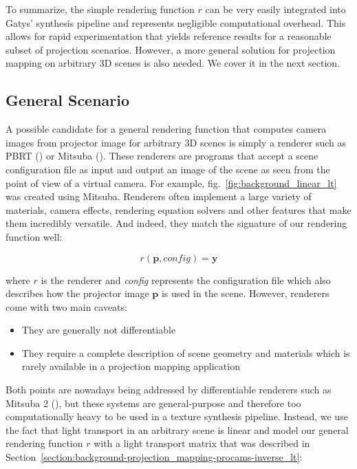 To summarize, the simple rendering function \(r\) can be very easily integrated into Gatys' synthesis pipeline and represents negligible computational overhead. This allows for rapid experimentation that yields reference results for a reasonable subset of projection scenarios. However, a more general solution for projection mapping on arbitrary 3D scenes is also needed. We cover it in the next section.

\subsection{General Scenario}
\label{section:methods-rendering_function-general}

A possible candidate for a general rendering function that computes camera images from projector image for arbitrary 3D scenes is simply a renderer such as PBRT (\citet{PBRT3e}) or Mitsuba (\citet{Mitsuba}). These renderers are programs that accept a scene configuration file as input and output an image of the scene as seen from the point of view of a virtual camera. For example, fig.~\ref{fig:background_linear_lt} was created using Mitsuba. Renderers often implement a large variety of materials, camera effects, rendering equation solvers and other features that make them incredibly versatile. And indeed, they match the signature of our rendering function well:

\begin{equation}
    \label{eq:rendering_function-renderer}
    r(\bm{p}, \textit{config}) = \bm{y}
\end{equation}

where \(r\) is the renderer and \textit{config} represents the configuration file which also describes how the projector image \(\bm{p}\) is used in the scene. However, renderers come with two main caveats:

\begin{itemize}
    \item They are generally not differentiable
    \item They require a complete description of scene geometry and materials which is rarely available in a projection mapping application
\end{itemize}

Both points are nowadays being addressed by differentiable renderers such as Mitsuba 2 (\citet{Mitsuba2}), but these systems are general-purpose and therefore too computationally heavy to be used in a texture synthesis pipeline. Instead, we use the fact that light transport in an arbitrary scene is linear and model our general rendering function \(r\) with a light transport matrix that was described in Section~\ref{section:background-projection_mapping-procams-inverse_lt}:


